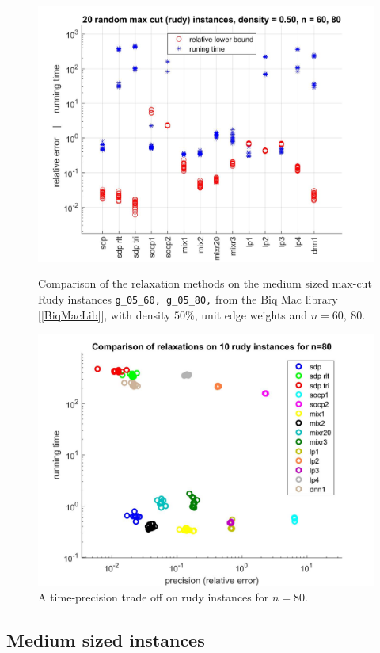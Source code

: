 \documentclass[12pt]{book}
\theoremstyle{definition}
\begin{document}
\begin{figure}
\centering
\includegraphics[scale=0.27]{img/comp1.jpg}
\caption[Comparison of relaxations - medium, dense instances of max-cut]{Comparison of the relaxation methods on the medium sized max-cut Rudy instances {\tt g\_05\_60, g\_05\_80,} from the Biq Mac library [\ref{BiqMacLib}], with density  $50\%$, unit edge weights and $n=60,\ 80$.} 
\label{comp1}
\includegraphics[scale=0.27]{img/comp1_segments.jpg}
\caption[Comparison of relaxations - a time-precision trade off]{A time-precision trade off on rudy instances for $n=80$.}
\label{comp1TradeOff}
\end{figure}

\subsection{Medium sized instances}
\end{document}
